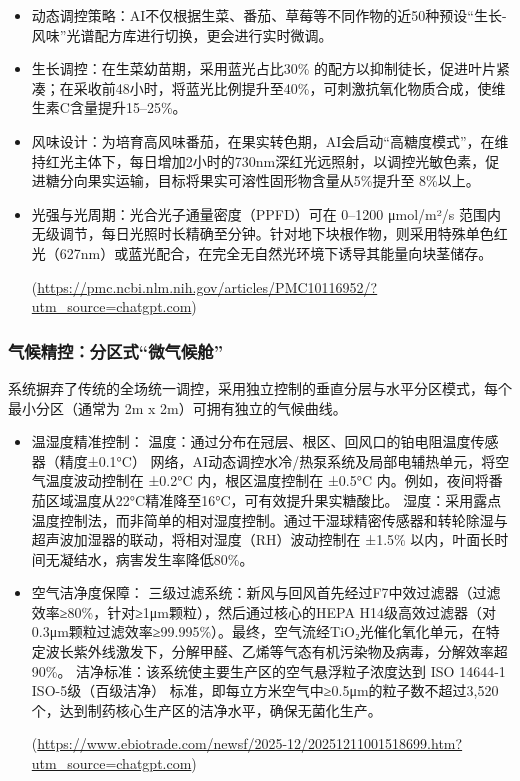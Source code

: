 \begin{itemize}
\item
  动态调控策略：AI不仅根据生菜、番茄、草莓等不同作物的近50种预设``生长-风味''光谱配方库进行切换，更会进行实时微调。
\item
  生长调控：在生菜幼苗期，采用蓝光占比30\% 的配方以抑制徒长，促进叶片紧凑；在采收前48小时，将蓝光比例提升至40\%，可刺激抗氧化物质合成，使维生素C含量提升15--25\%。
\item
  风味设计：为培育高风味番茄，在果实转色期，AI会启动``高糖度模式''，在维持红光主体下，每日增加2小时的730nm深红光远照射，以调控光敏色素，促进糖分向果实运输，目标将果实可溶性固形物含量从5\%提升至 8\%以上。
\item
  光强与光周期：光合光子通量密度（PPFD）可在 0--1200 μmol/m²/s 范围内无级调节，每日光照时长精确至分钟。针对地下块根作物，则采用特殊单色红光（627nm）或蓝光配合，在完全无自然光环境下诱导其能量向块茎储存。

(\url{https://pmc.ncbi.nlm.nih.gov/articles/PMC10116952/?utm\_source=chatgpt.com})
\end{itemize}

\subsubsection{气候精控：分区式``微气候舱''}\label{ux6c14ux5019ux7cbeux63a7ux5206ux533aux5f0fux5faeux6c14ux5019ux8231}

系统摒弃了传统的全场统一调控，采用独立控制的垂直分层与水平分区模式，每个最小分区（通常为 2m x 2m）可拥有独立的气候曲线。

\begin{itemize}
\item
  温湿度精准控制： 温度：通过分布在冠层、根区、回风口的铂电阻温度传感器（精度±0.1°C） 网络，AI动态调控水冷/热泵系统及局部电辅热单元，将空气温度波动控制在 ±0.2°C 内，根区温度控制在 ±0.5°C 内。例如，夜间将番茄区域温度从22°C精准降至16°C，可有效提升果实糖酸比。 湿度：采用露点温度控制法，而非简单的相对湿度控制。通过干湿球精密传感器和转轮除湿与超声波加湿器的联动，将相对湿度（RH）波动控制在 ±1.5\% 以内，叶面长时间无凝结水，病害发生率降低80\%。
\item
  空气洁净度保障： 三级过滤系统：新风与回风首先经过F7中效过滤器（过滤效率≥80\%，针对≥1μm颗粒），然后通过核心的HEPA H14级高效过滤器（对0.3μm颗粒过滤效率≥99.995\%）。最终，空气流经TiO₂光催化氧化单元，在特定波长紫外线激发下，分解甲醛、乙烯等气态有机污染物及病毒，分解效率超90\%。 洁净标准：该系统使主要生产区的空气悬浮粒子浓度达到 ISO 14644-1 ISO-5级（百级洁净） 标准，即每立方米空气中≥0.5μm的粒子数不超过3,520个，达到制药核心生产区的洁净水平，确保无菌化生产。

(\url{https://www.ebiotrade.com/newsf/2025-12/20251211001518699.htm?utm\_source=chatgpt.com})
\end{itemize}

